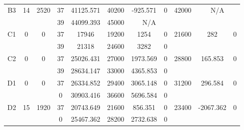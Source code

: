 \begin{sidewaystable}
\begin{tabular}{c||c|c||c|c|c|c|c||c|c|c}
         &
        
      \\
      \hline
      \multirow{2}{*}{B3} &
      \multirow{2}{*}{14} &
      \multirow{2}{*}{2520} &
      37 &
      41125.571 &
      40200 &
        -925.571 &
        0 &
      \multirow{2}{*}{42000} &
        \multicolumn{2}{c}{\multirow{2}{*}{N/A}}
      \\
      \cline{4-8}
       &
       &
       &
      39 &
      44099.393 &
      45000 &
        \multicolumn{2}{|c||}{N/A} &
      
        
      \\
      \hline
      \multirow{2}{*}{C1} &
      \multirow{2}{*}{0} &
      \multirow{2}{*}{0} &
      37 &
      17946 &
      19200 &
        1254 &
        0 &
      \multirow{2}{*}{21600} &
        \multirow{2}{*}{282} &
        \multirow{2}{*}{0}
      \\
      \cline{4-8}
       &
       &
       &
      39 &
      21318 &
      24600 &
        3282 &
        0 &
      
         &
        
      \\
      \hline
      \multirow{2}{*}{C2} &
      \multirow{2}{*}{0} &
      \multirow{2}{*}{0} &
      37 &
      25026.431 &
      27000 &
        1973.569 &
        0 &
      \multirow{2}{*}{28800} &
        \multirow{2}{*}{165.853} &
        \multirow{2}{*}{0}
      \\
      \cline{4-8}
       &
       &
       &
      39 &
      28634.147 &
      33000 &
        4365.853 &
        0 &
      
         &
        
      \\
      \hline
      \multirow{2}{*}{D1} &
      \multirow{2}{*}{0} &
      \multirow{2}{*}{0} &
      37 &
      26334.852 &
      29400 &
        3065.148 &
        0 &
      \multirow{2}{*}{31200} &
        \multirow{2}{*}{296.584} &
        \multirow{2}{*}{0}
      \\
      \cline{4-8}
       &
       &
       &
      0 &
      30903.416 &
      36600 &
        5696.584 &
        0 &
      
         &
        
      \\
      \hline
      \multirow{2}{*}{D2} &
      \multirow{2}{*}{15} &
      \multirow{2}{*}{1920} &
      37 &
      20743.649 &
      21600 &
        856.351 &
        0 &
      \multirow{2}{*}{23400} &
        \multirow{2}{*}{-2067.362} &
        \multirow{2}{*}{0}
      \\
      \cline{4-8}
       &
       &
       &
      0 &
      25467.362 &
      28200 &
        2732.638 &
        0 &
      

\end{tabular}
\end{sidewaystable}
